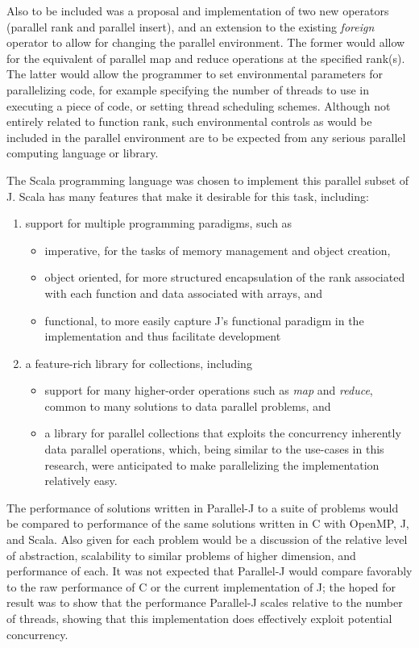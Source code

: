 Also to be included was a proposal and implementation of two new operators (parallel rank and parallel insert), 
and an extension to the existing \textit{foreign} operator to allow for changing the parallel environment. 
The former would allow for the equivalent of parallel map and reduce operations at the specified rank(s). 
The latter would allow the programmer to set environmental parameters for parallelizing code, 
for example specifying the number of threads to use in executing a piece of code, or setting thread scheduling schemes.
Although not entirely related to function rank, such environmental controls as would be included in the parallel environment 
are to be expected from any serious parallel computing language or library.

The Scala programming language\cite{scala} 
was chosen to implement this parallel subset of J.
Scala has many features that make it desirable for this task, including: 
\begin{enumerate} 
	\item support for multiple programming paradigms, such as
	\begin{itemize}
		\item imperative, for the tasks of memory management and object creation,
		\item object oriented, for more structured encapsulation of the rank associated with each function 
			and data associated with arrays, and
		\item functional, to more easily capture J's functional paradigm in the implementation and thus facilitate development
	\end{itemize}
	\item a feature-rich library for collections, including 
	\begin{itemize}
		\item support for many higher-order operations such as \textit{map} and \textit{reduce}\cite{scala28col}, 
			common to many solutions to data parallel problems, and
		\item a library for parallel collections that exploits the concurrency inherently data parallel operations\cite{pc},
			which, being similar to the use-cases in this research, were anticipated to make parallelizing the implementation relatively easy.
	\end{itemize}
\end{enumerate}

The performance of solutions written in Parallel-J to a suite of problems would be compared to
performance of the same solutions written in C with OpenMP, J, and Scala.
Also given for each problem would be 
a discussion of the relative level of abstraction, scalability to similar problems of higher dimension, and performance of each. 
It was not expected that Parallel-J would compare favorably to the raw performance of C or the current implementation of J; 
the hoped for result was to show that the performance Parallel-J scales relative to the number of threads, 
showing that this implementation does effectively exploit potential concurrency.

